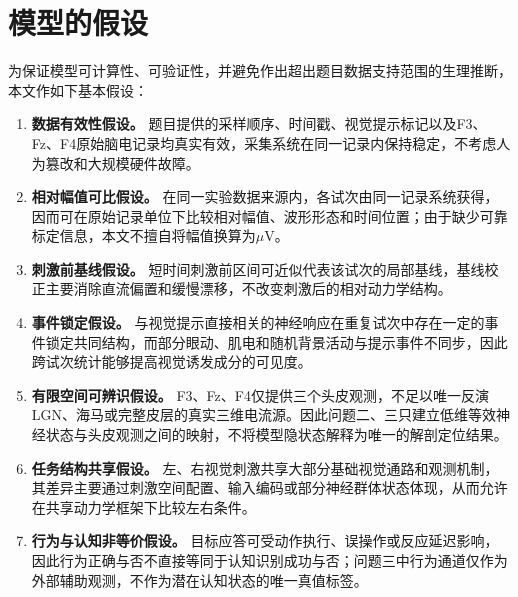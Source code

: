 \section{模型的假设}

为保证模型可计算性、可验证性，并避免作出超出题目数据支持范围的生理推断，本文作如下基本假设：

\begin{enumerate}[label=\arabic*.]
    \item \textbf{数据有效性假设。} 题目提供的采样顺序、时间戳、视觉提示标记以及F3、Fz、F4原始脑电记录均真实有效，采集系统在同一记录内保持稳定，不考虑人为篡改和大规模硬件故障。
    \item \textbf{相对幅值可比假设。} 在同一实验数据来源内，各试次由同一记录系统获得，因而可在原始记录单位下比较相对幅值、波形形态和时间位置；由于缺少可靠标定信息，本文不擅自将幅值换算为$\mu\mathrm{V}$。
    \item \textbf{刺激前基线假设。} 短时间刺激前区间可近似代表该试次的局部基线，基线校正主要消除直流偏置和缓慢漂移，不改变刺激后的相对动力学结构。
    \item \textbf{事件锁定假设。} 与视觉提示直接相关的神经响应在重复试次中存在一定的事件锁定共同结构，而部分眼动、肌电和随机背景活动与提示事件不同步，因此跨试次统计能够提高视觉诱发成分的可见度。
    \item \textbf{有限空间可辨识假设。} F3、Fz、F4仅提供三个头皮观测，不足以唯一反演LGN、海马或完整皮层的真实三维电流源。因此问题二、三只建立低维等效神经状态与头皮观测之间的映射，不将模型隐状态解释为唯一的解剖定位结果。
    \item \textbf{任务结构共享假设。} 左、右视觉刺激共享大部分基础视觉通路和观测机制，其差异主要通过刺激空间配置、输入编码或部分神经群体状态体现，从而允许在共享动力学框架下比较左右条件。
    \item \textbf{行为与认知非等价假设。} 目标应答可受动作执行、误操作或反应延迟影响，因此行为正确与否不直接等同于认知识别成功与否；问题三中行为通道仅作为外部辅助观测，不作为潜在认知状态的唯一真值标签。
\end{enumerate}
